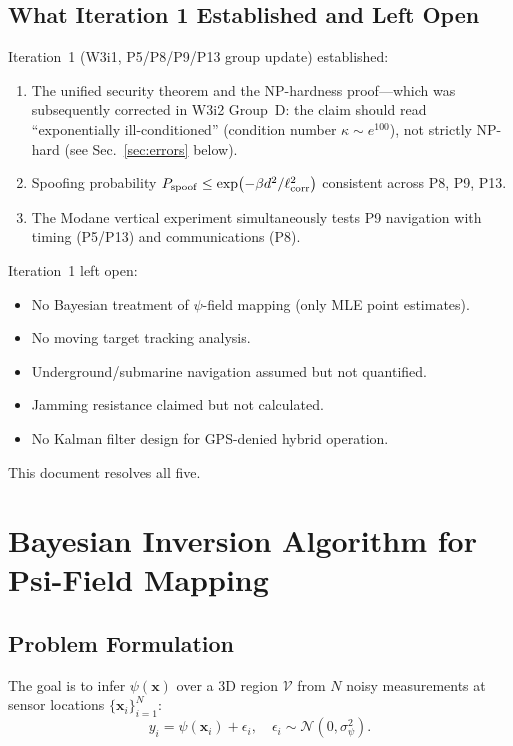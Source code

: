 \documentclass[aps,prd,twocolumn,superscriptaddress,nofootinbib]{revtex4-2}
\newcommand{\xvec}{\mathbf{x}}
\begin{document}
\subsection{What Iteration 1 Established and Left Open}

Iteration~1 (W3i1, P5/P8/P9/P13 group update) established:
\begin{enumerate}
\item The unified security theorem and the NP-hardness proof---which
  was subsequently corrected in W3i2 Group~D: the claim should read
  ``exponentially ill-conditioned'' (condition number $\kappa \sim e^{100}$),
  not strictly NP-hard (see Sec.~\ref{sec:errors} below).
\item Spoofing probability $P_{\rm spoof} \leq
  \exp(-\beta d^2/\ell_{\rm corr}^2)$ consistent across P8, P9, P13.
\item The Modane vertical experiment simultaneously tests P9 navigation
  with timing (P5/P13) and communications (P8).
\end{enumerate}

Iteration~1 left open:
\begin{itemize}
\item No Bayesian treatment of $\psi$-field mapping
  (only MLE point estimates).
\item No moving target tracking analysis.
\item Underground/submarine navigation assumed but not quantified.
\item Jamming resistance claimed but not calculated.
\item No Kalman filter design for GPS-denied hybrid operation.
\end{itemize}
This document resolves all five.

\section{Bayesian Inversion Algorithm for Psi-Field Mapping}
\label{sec:bayes}

\subsection{Problem Formulation}

The goal is to infer $\psi(\xvec)$ over a 3D region $\mathcal{V}$ from
$N$ noisy measurements at sensor locations $\{\xvec_i\}_{i=1}^N$:
\begin{equation}
y_i = \psi(\xvec_i) + \epsilon_i,\quad
\epsilon_i \sim \mathcal{N}(0,\sigma_\psi^2).
\label{eq:meas-model}
\end{equation}
\end{document}
